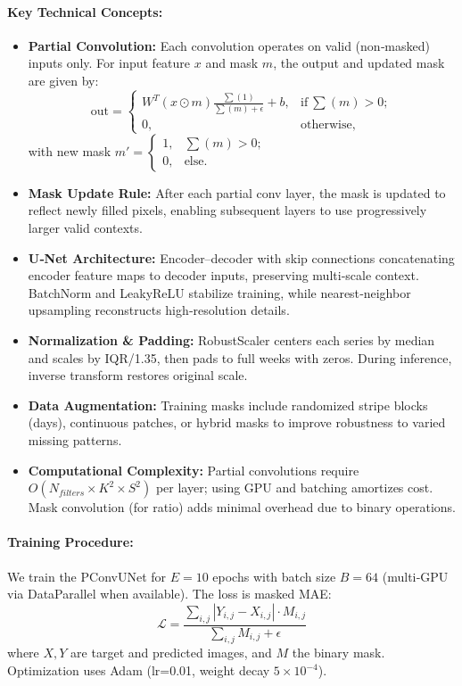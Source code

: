\documentclass[10pt,twocolumn]{article}
\begin{document}
	\paragraph{Key Technical Concepts:}
	\begin{itemize}
		\item \textbf{Partial Convolution:} Each convolution operates on valid (non‐masked) inputs only. For input feature $x$ and mask $m$, the output and updated mask are given by:
		\[
		\text{out} = \begin{cases}
			W^T (x\odot m) \frac{\sum(1)}{\sum(m)+\epsilon} + b, & \text{if}\ \sum(m)>0; \\ 
			0, & \text{otherwise,}
		\end{cases}
		\]
		with new mask $m' = \begin{cases}1,&\sum(m)>0;\\0,&\text{else.}\end{cases}$
		\item \textbf{Mask Update Rule:} After each partial conv layer, the mask is updated to reflect newly filled pixels, enabling subsequent layers to use progressively larger valid contexts.
		\item \textbf{U‑Net Architecture:} Encoder–decoder with skip connections concatenating encoder feature maps to decoder inputs, preserving multi‐scale context. BatchNorm and LeakyReLU stabilize training, while nearest‐neighbor upsampling reconstructs high‐resolution details.
		\item \textbf{Normalization \& Padding:} RobustScaler centers each series by median and scales by IQR/1.35, then pads to full weeks with zeros. During inference, inverse transform restores original scale.
		\item \textbf{Data Augmentation:} Training masks include randomized stripe blocks (days), continuous patches, or hybrid masks to improve robustness to varied missing patterns.
		\item \textbf{Computational Complexity:} Partial convolutions require $O(N_{filters}\times K^2\times S^2)$ per layer; using GPU and batching amortizes cost. Mask convolution (for ratio) adds minimal overhead due to binary operations.
	\end{itemize}
	
	\paragraph{Training Procedure:}
	We train the PConvUNet for $E=10$ epochs with batch size $B=64$ (multi‐GPU via DataParallel when available). The loss is masked MAE:
	\[
	\mathcal{L} = \frac{\sum_{i,j} |Y_{i,j} - X_{i,j}|\cdot M_{i,j}}{\sum_{i,j} M_{i,j} + \epsilon}
	\]
	where $X,Y$ are target and predicted images, and $M$ the binary mask. Optimization uses Adam (lr=0.01, weight decay $5\times10^{-4}$).
	
\end{document}
